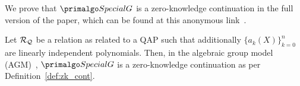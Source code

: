 We  prove that $\SpecialG$ is a zero-knowledge continuation in the full version of the paper, which can be found at this anonymous link~\cite{anonymous}.
\begin{theorem}
\label{sec_specialg}
Let $\mathcal{R}_{\mathcal{Q}}$ be a relation as related to a QAP such that additionally $\{a_k(X)\}_{k=0}^n$ are linearly independent polynomials. Then, in the 
algebraic group model (AGM)~\cite{Fuchs_AGM}, $\SpecialG$ is a zero-knowledge continuation as per Definition~\ref{def:zk_cont}. 
\end{theorem}

